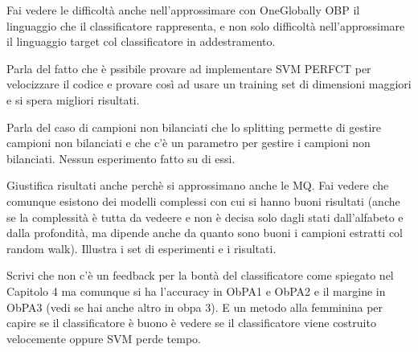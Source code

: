 Fai vedere le difficoltà anche nell'approssimare con OneGlobally OBP il linguaggio che il classificatore rappresenta, e non solo difficoltà nell'approssimare il linguaggio target col classificatore in addestramento.

Parla del fatto che è pssibile provare ad implementare SVM PERFCT per velocizzare il codice e provare così ad usare un training set di dimensioni maggiori e si spera migliori risultati.

Parla del caso di campioni non bilanciati che lo splitting permette di gestire campioni non bilanciati e che c'è un parametro per gestire i campioni non bilanciati. Nessun esperimento fatto su di essi.

Giustifica risultati anche perchè si approssimano anche le MQ.
Fai vedere che comunque esistono dei modelli complessi con cui si hanno buoni risultati (anche se la complessità è tutta da vedeere e non è decisa solo dagli stati dall'alfabeto e dalla profondità, ma dipende anche da quanto sono buoni i campioni estratti col random walk).
Illustra i set di esperimenti e i risultati.

Scrivi che non c'è un feedback per la bontà del classificatore come spiegato nel Capitolo 4 ma comunque si ha l'accuracy in ObPA1 e ObPA2 e il margine in ObPA3 (vedi se hai anche altro in obpa 3). E un metodo alla femminina per capire se il classificatore è buono è vedere se il classificatore viene costruito velocemente oppure SVM perde tempo. 